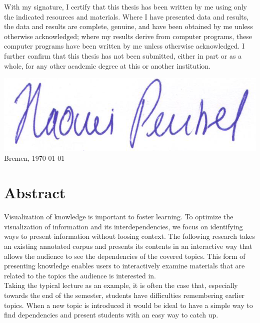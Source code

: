 \documentclass[twoside, 12pt]{article}
\begin{document}
\newpage
\noindent
With my signature, I certify that this thesis has been written by me using only the indicated resources and materials. Where I have presented data and results, the data and results are complete, genuine, and have been obtained by me unless otherwise acknowledged; where my results derive from computer programs, these computer programs have been written by me unless otherwise acknowledged. I further confirm that this thesis has not been submitted, either in part or as a whole, for any other academic degree at this or another institution.

  \vspace{20mm}

    \includegraphics[scale=0.2]{assets/Signature}
 \hfill Bremen, \today
  
\newpage

\thispagestyle{fancy} %


 \section*{Abstract}
 \label{sec:abstract}
Visualization of knowledge is important to foster learning. To optimize the visualization of information and its interdependencies, we focus on identifying ways to present information without loosing context. The following research takes an existing annotated corpus and presents its contents in an interactive way that allows the audience to see the dependencies of the covered topics. This form of presenting knowledge enables users to interactively examine materials that are related to the topics the audience is interested in.\\

Taking the typical lecture as an example, it is often the case that, especially towards the end of the semester, students have difficulties remembering earlier topics. When a new topic is introduced it would be ideal to have a simple way to find dependencies and present students with an easy way to catch up.\\
\end{document}
